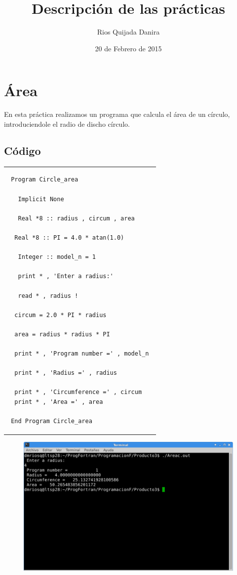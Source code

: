 \documentclass[10pt]{article}
\title{Descripción de las prácticas}
\author{Rios Quijada Danira}
\date{20 de Febrero de 2015}
\begin{document}
\maketitle
\section{Área}
En esta práctica realizamos un programa que calcula el área de un círculo, introduciendole el radio de discho círculo.

\subsection{Código}
\begin{tabular}{l}
\begin{verbatim}  
 Program Circle_area 

   Implicit None 

   Real *8 :: radius , circum , area 

  Real *8 :: PI = 4.0 * atan(1.0) 

   Integer :: model_n = 1 

   print * , 'Enter a radius:' 

   read * , radius !

  circum = 2.0 * PI * radius 

  area = radius * radius * PI 

  print * , 'Program number =' , model_n 

  print * , 'Radius =' , radius 

  print * , 'Circumference =' , circum 
  print * , 'Area =' , area 

 End Program Circle_area
\end{verbatim}
\end{tabular}


\begin{figure}
  \centering
    \includegraphics[scale=0.4]{A}
\end{figure}
\end{document}
